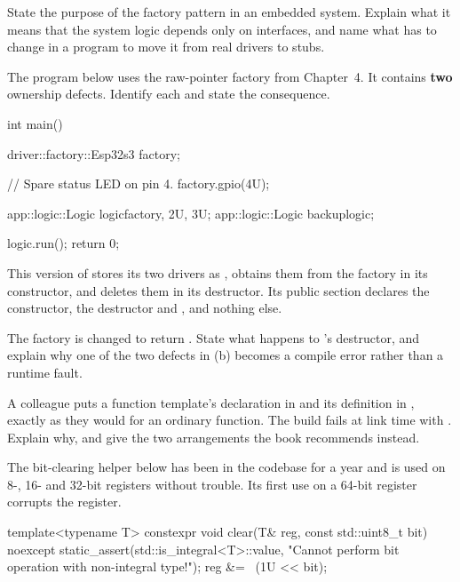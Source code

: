 \label{exa:q:6}

 State the purpose of the factory pattern in an embedded system. Explain what it means that
the system logic depends only on interfaces, and name what has to change in a program to move it
from real drivers to stubs. 

 The program below uses the raw-pointer factory from Chapter~4. It contains \textbf{two}
ownership defects. Identify each and state the consequence. 

\begin{cppcode}
int main()
{
    driver::factory::Esp32s3 factory{};

    // Spare status LED on pin 4.
    factory.gpio(4U);

    app::logic::Logic logic{factory, 2U, 3U};
    app::logic::Logic backup{logic};

    logic.run();
    return 0;
}
\end{cppcode}

\noindent This version of  stores its two drivers as ,
obtains them from the factory in its constructor, and deletes them in its destructor. Its public
section declares the constructor, the destructor and , and nothing else.

 The factory is changed to return . State
what happens to 's destructor, and explain why one of the two defects in (b) becomes a
compile error rather than a runtime fault. 

\label{exa:q:7}

 A colleague puts a function template's declaration in  and its
definition in , exactly as they would for an ordinary function. The build fails
at link time with . Explain why, and give the two arrangements the book
recommends instead. 

 The bit-clearing helper below has been in the codebase for a year and is used on 8-, 16-
and 32-bit registers without trouble. Its first use on a 64-bit register corrupts the register.

\begin{cppcode}
template<typename T>
constexpr void clear(T& reg, const std::uint8_t bit) noexcept
{
    static_assert(std::is_integral<T>::value,
        "Cannot perform bit operation with non-integral type!");
    reg &= ~(1U << bit);
}
\end{cppcode}

